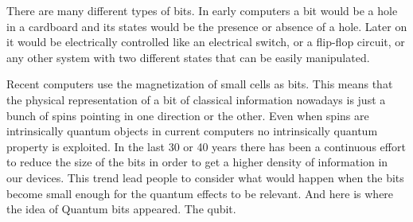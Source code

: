
There are many different types of bits. In early computers a bit would be a hole in a cardboard and its states would be the presence or absence of a hole. Later on it would be electrically controlled like an electrical switch, or a flip-flop circuit, or any other system with two different states that can be easily manipulated.

Recent computers use the magnetization of small cells as bits. This means that the physical representation of a bit of classical information nowadays is just a bunch of spins pointing in one direction or the other.
Even when spins are intrinsically quantum objects in current computers no intrinsically quantum property is exploited.
In the last 30 or 40 years there has been a continuous effort to reduce the size of the bits in order to get a higher density of information in our devices. This trend lead people to consider what would happen when the bits become small enough for the quantum effects to be relevant. And here is where the idea of Quantum bits appeared.
The qubit.


